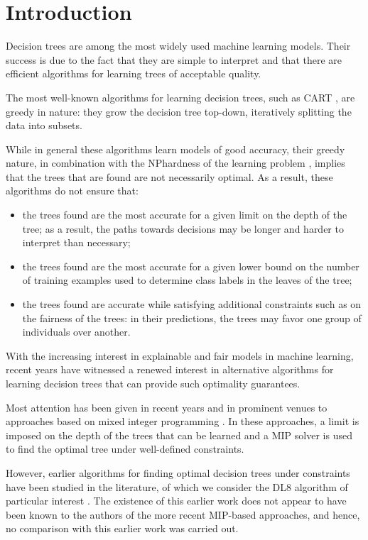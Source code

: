 \section{Introduction}
Decision trees are among the most widely used machine learning models. Their success is due to the fact that they are simple to interpret and that there are efficient algorithms for learning trees of acceptable quality.

The most well-known algorithms for learning decision trees, such as CART \cite{breiman,quinlan:1993c4}, are greedy in nature: they grow the decision tree top-down, iteratively splitting the data into subsets.

While in general these algorithms learn models of good accuracy, their greedy nature, in combination with the NPhardness of the learning problem \cite{laurent:1976constructing}, implies that the trees that are found are not necessarily optimal. As a result, these algorithms do not ensure that:

\begin{itemize}
	\item the trees found are the most accurate for a given limit on
	the depth of the tree; as a result, the paths towards decisions may be longer and harder to interpret than necessary;
	\item  the trees found are the most accurate for a given lower
	bound on the number of training examples used to determine class labels in the leaves of the tree;
	\item the trees found are accurate while satisfying additional constraints such as on the fairness of the trees: in their predictions, the trees may favor one group of individuals over another.
\end{itemize}

With the increasing interest in explainable and fair models in machine learning, recent years have witnessed a renewed interest in alternative algorithms for learning decision trees that can provide such optimality guarantees.

Most attention has been given in recent years and in prominent venues to approaches based on mixed integer programming \cite{bertsimas:2017optimal,verwer:2019learning,aghaei:2019learning}. In these approaches, a limit is imposed on the depth of the trees that can be learned and a MIP solver is used to find the optimal tree under well-defined constraints.

However, earlier algorithms for finding optimal decision trees under constraints have been studied in the literature, of which we consider the DL8 algorithm of particular interest \cite{nijssen:2007mining,nijssen:2010optimal}. The existence of this earlier work does not appear to have been known to the authors of the more recent MIP-based approaches, and hence, no comparison with this earlier work was carried out.

